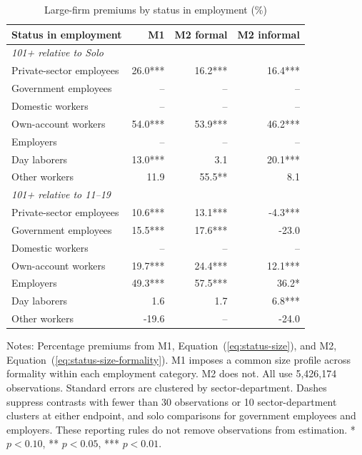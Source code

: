 \begin{table}[htbp]
\centering\small
\caption{Large-firm premiums by status in employment (\%)}
\label{tab:status-premiums}
\begin{tabular}{lrrr}
\toprule
Status in employment & M1 & M2 formal & M2 informal \\
\midrule
\multicolumn{4}{l}{\textit{101+ relative to Solo}} \\
Private-sector employees & 26.0*** & 16.2*** & 16.4*** \\
Government employees & -- & -- & -- \\
Domestic workers & -- & -- & -- \\
Own-account workers & 54.0*** & 53.9*** & 46.2*** \\
Employers & -- & -- & -- \\
Day laborers & 13.0*** & 3.1 & 20.1*** \\
Other workers & 11.9 & 55.5** & 8.1 \\
\midrule
\multicolumn{4}{l}{\textit{101+ relative to 11--19}} \\
Private-sector employees & 10.6*** & 13.1*** & -4.3*** \\
Government employees & 15.5*** & 17.6*** & -23.0 \\
Domestic workers & -- & -- & -- \\
Own-account workers & 19.7*** & 24.4*** & 12.1*** \\
Employers & 49.3*** & 57.5*** & 36.2* \\
Day laborers & 1.6 & 1.7 & 6.8*** \\
Other workers & -19.6 & -- & -24.0 \\
\bottomrule
\end{tabular}
\par\vspace{0.3em}
\begin{minipage}{0.97\textwidth}\footnotesize
Notes: Percentage premiums from M1, Equation~(\ref{eq:status-size}), and M2, Equation~(\ref{eq:status-size-formality}). M1 imposes a common size profile across formality within each employment category. M2 does not. All use 5,426,174 observations. Standard errors are clustered by sector-department. Dashes suppress contrasts with fewer than 30 observations or 10 sector-department clusters at either endpoint, and solo comparisons for government employees and employers. These reporting rules do not remove observations from estimation. * $p<0.10$, ** $p<0.05$, *** $p<0.01$.
\end{minipage}
\end{table}
